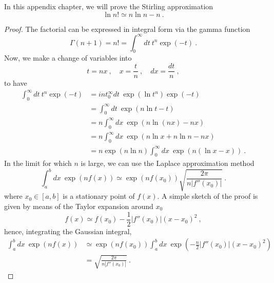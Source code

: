     In this appendix chapter, we will prove the Stirling approximation 
    \begin{equation}\label{app:stirl}
        \ln n! \simeq n \ln n - n ~.
    \end{equation}
    \begin{proof}
        The factorial can be expressed in integral form via the gamma function 
        \begin{equation*}
            \Gamma (n + 1) = n! = \int_0^\infty dt ~ t^n \exp(-t) ~.
        \end{equation*}
        Now, we make a change of variables into 
        \begin{equation*}
            t = n x ~, \quad x = \frac{t}{n} ~, \quad dx = \frac{dt}{n} ~,
        \end{equation*}
        to have 
        \begin{equation*}
        \begin{aligned}
            \int_0^\infty dt ~ t^n \exp(-t) & = int_0^\infty dt ~ \exp(\ln t^n) \exp(-t) \\ & = \int_0^\infty dt ~ \exp(n\ln t - t) \\ & = n \int_0^\infty dx ~ \exp(n \ln (nx) - nx) \\ & = n \int_0^\infty dx ~ \exp(n \ln x + n \ln n - nx) \\ & = n \exp(n \ln n) \int_0^\infty dx ~ \exp(n (\ln x - x)) ~.
        \end{aligned}
        \end{equation*}
        In the limit for which $n$ is large, we can use the Laplace approximation method 
        \begin{equation*}
            \int_a^b dx ~ \exp(n f(x)) \simeq \exp(n f(x_0)) \sqrt{\frac{2\pi}{n |f'' (x_0)|}} ~.
        \end{equation*}
        where $x_0 \in [a, b]$ is a stationary point of $f(x)$. A simple sketch of the proof is given by means of the Taylor expansion around $x_0$
        \begin{equation*}
            f(x) \simeq f(x_0) - \frac{1}{2} |f''(x_0)| (x - x_0)^2 ~,
        \end{equation*}
        hence, integrating the Gaussian integral,
        \begin{equation*}
        \begin{aligned}
            \int_a^b dx ~ \exp(n f(x)) & \simeq \exp(n f(x_0)) \int_a^b dx ~ \exp(- \frac{n}{2} |f''(x_0)| (x - x_0)^2) \\ & = \sqrt{\frac{2\pi}{n |f'' (x_0)|}} ~.

\end{aligned}
\end{equation*}
\end{proof}
